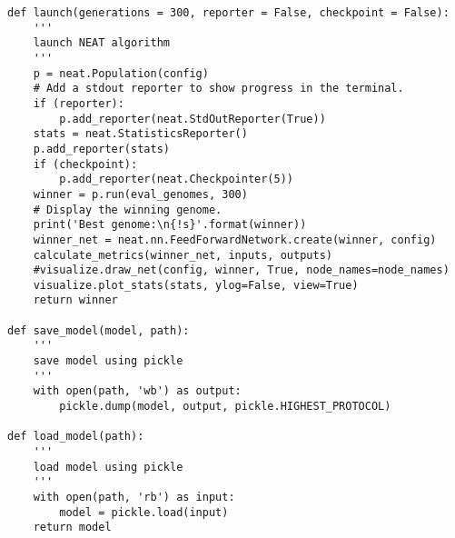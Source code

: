 \begin{lstlisting}[style=pythonstyle, caption={Программный код реализации алгоритма NEAT с применением модуля neat-python}, label={lst:pythoncode}]
def launch(generations = 300, reporter = False, checkpoint = False):
    '''
    launch NEAT algorithm
    '''
    p = neat.Population(config)
    # Add a stdout reporter to show progress in the terminal.
    if (reporter):
        p.add_reporter(neat.StdOutReporter(True))
    stats = neat.StatisticsReporter()
    p.add_reporter(stats)
    if (checkpoint):
        p.add_reporter(neat.Checkpointer(5))
    winner = p.run(eval_genomes, 300)
    # Display the winning genome.
    print('Best genome:\n{!s}'.format(winner))
    winner_net = neat.nn.FeedForwardNetwork.create(winner, config)
    calculate_metrics(winner_net, inputs, outputs)
    #visualize.draw_net(config, winner, True, node_names=node_names)
    visualize.plot_stats(stats, ylog=False, view=True)
    return winner

def save_model(model, path):
    '''
    save model using pickle
    '''
    with open(path, 'wb') as output:
        pickle.dump(model, output, pickle.HIGHEST_PROTOCOL)

def load_model(path):
    '''
    load model using pickle
    '''
    with open(path, 'rb') as input:
        model = pickle.load(input)
    return model
        
    
        
\end{lstlisting}